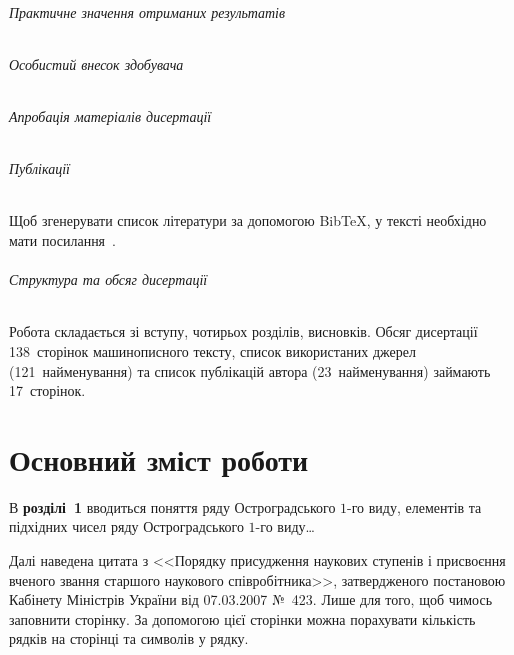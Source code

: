 \documentclass[
]{mon2017dev-aref}[2019/11/16]
\theoremstyle{plain}
\theoremstyle{definition}
\theoremstyle{remark}
\begin{document}
\paragraph{Практичне значення отриманих результатів}

\paragraph{Особистий внесок здобувача}

\paragraph{Апробація матеріалів дисертації}

\paragraph{Публікації}

Щоб згенерувати список літератури за допомогою Bib\TeX, у тексті
необхідно мати посилання~\cite{Bar98fasp1,Bar98fasp2,PrB01umc}.

\paragraph{Структура та обсяг дисертації}

Робота складається зі вступу, чотирьох розділів, висновків. Обсяг
дисертації 138~сторінок машинописного тексту, список використаних
джерел (121~найменування) та список публікацій автора
(23~найменування) займають 17~сторінок.


\part{Основний зміст роботи}

В \textbf{розділі~1} вводиться поняття ряду Остроградського $1$-го
виду, елементів та підхідних чисел ряду Остроградського $1$-го
виду\ldots

Далі наведена цитата з <<Порядку присудження наукових ступенів і
присвоєння вченого звання старшого наукового співробітника>>,
затвердженого постановою Кабінету Міністрів України від 07.03.2007
№~423. Лише для того, щоб чимось заповнити сторінку. За допомогою
цієї сторінки можна порахувати кількість рядків на сторінці та
символів у рядку.
\end{document}
